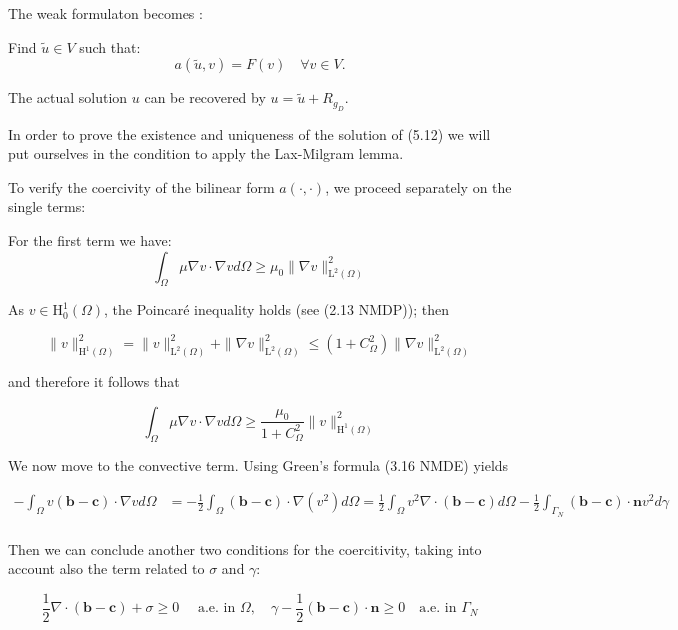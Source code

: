 \documentclass[11pt]{book}
\begin{document}
The weak formulaton becomes :

Find \( \tilde{u} \in V \) such that:
\[
a(\tilde{u}, v) = F(v) \quad \forall v \in V.
\]

The actual solution \( u \) can be recovered by \( u = \tilde{u} + R_{g_D} \).


In order to prove the existence and uniqueness of the solution of (5.12) we will put ourselves in the condition to apply the Lax-Milgram lemma.

To verify the coercivity of the bilinear form $a(\cdot, \cdot)$, we proceed separately on the single terms:

For the first term we have:
\begin{equation}
\int_{\Omega} \mu \nabla v \cdot \nabla v d \Omega \geq \mu_{0}\|\nabla v\|_{\mathrm{L}^{2}(\Omega)}^{2} 
\end{equation}


As $v \in \mathrm{H}_{0}^{1}(\Omega)$, the Poincaré inequality holds (see (2.13 NMDP)); then

$$
\|v\|_{\mathrm{H}^{1}(\Omega)}^{2}=\|v\|_{\mathrm{L}^{2}(\Omega)}^{2}+\|\nabla v\|_{\mathrm{L}^{2}(\Omega)}^{2} \leq\left(1+C_{\Omega}^{2}\right)\|\nabla v\|_{\mathrm{L}^{2}(\Omega)}^{2}
$$

and therefore it follows that

$$
\int_{\Omega} \mu \nabla v \cdot \nabla v d \Omega \geq \frac{\mu_{0}}{1+C_{\Omega}^{2}}\|v\|_{\mathrm{H}^{1}(\Omega)}^{2}
$$

We now move to the convective term. Using Green's formula (3.16 NMDE) yields

$$
\begin{aligned}
-\int_{\Omega} v (\mathbf{b}-\mathbf{c}) \cdot \nabla v d \Omega & =-\frac{1}{2} \int_{\Omega} (\mathbf{b}-\mathbf{c}) \cdot \nabla\left(v^{2}\right) d \Omega=\frac{1}{2} \int_{\Omega} v^{2} \nabla \cdot(\mathbf{b}-\mathbf{c}) d \Omega-\frac{1}{2} \int_{\Gamma_N} (\mathbf{b}-\mathbf{c}) \cdot \mathbf{n} v^{2} d \gamma \\
\end{aligned}
$$


Then we can conclude another two conditions for the coercitivity, taking into account also the term related to $\sigma$ and $\gamma$: 

\begin{equation}
\frac{1}{2} \nabla \cdot (\mathbf{b}-\mathbf{c})+\sigma \geq 0 \quad \text { a.e. in } \Omega,  \quad \gamma - \frac{1}{2} (\mathbf{b}-\mathbf{c})\cdot \mathbf{n} \geq 0 \quad \text{a.e. in } \Gamma_N
\end{equation}
\end{document}

